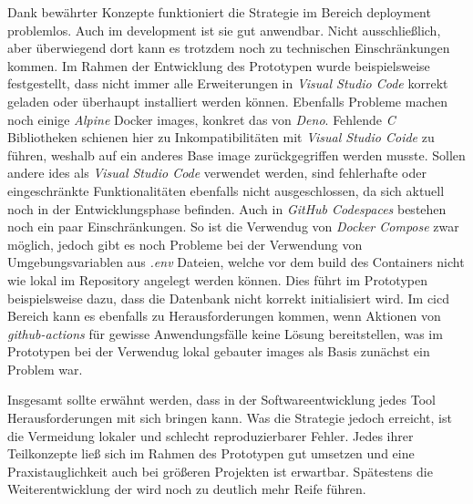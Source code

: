Dank bewährter Konzepte funktioniert die Strategie im Bereich \Gls{deployment} problemlos. Auch im \Gls{development} ist sie gut anwendbar. Nicht ausschließlich, aber überwiegend dort kann es trotzdem noch zu technischen Einschränkungen kommen. Im Rahmen der Entwicklung des Prototypen wurde beispielsweise festgestellt, dass nicht immer alle Erweiterungen in \textit{Visual Studio Code} korrekt geladen oder überhaupt installiert werden können. Ebenfalls Probleme machen noch einige \textit{Alpine} Docker \Glspl{image}, konkret das von \textit{Deno}. Fehlende \textit{C} Bibliotheken schienen hier zu Inkompatibilitäten mit \textit{Visual Studio Coide} zu führen, weshalb auf ein anderes Base \Gls{image} zurückgegriffen werden musste. Sollen andere \Glspl{ide} als \textit{Visual Studio Code} verwendet werden, sind fehlerhafte oder eingeschränkte Funktionalitäten ebenfalls nicht ausgeschlossen, da sich  aktuell noch in der Entwicklungsphase befinden. Auch in \textit{GitHub Codespaces} bestehen noch ein paar Einschränkungen. So ist die Verwendug von \textit{Docker Compose} zwar möglich, jedoch gibt es noch Probleme bei der Verwendung von Umgebungsvariablen aus \textit{.env} Dateien, welche vor dem \Gls{build} des Containers nicht wie lokal im Repository angelegt werden können. Dies führt im Prototypen beispielsweise dazu, dass die Datenbank nicht korrekt initialisiert wird. Im \Gls{cicd} Bereich kann es ebenfalls zu Herausforderungen kommen, wenn Aktionen von \textit{\Gls{github-actions}} für gewisse Anwendungsfälle keine Lösung bereitstellen, was im Prototypen bei der Verwendug lokal gebauter \Glspl{image} als Basis zunächst ein Problem war.

Insgesamt sollte erwähnt werden, dass in der Softwareentwicklung jedes Tool Herausforderungen mit sich bringen kann. Was die  Strategie jedoch erreicht, ist die Vermeidung lokaler und schlecht reproduzierbarer Fehler. Jedes ihrer Teilkonzepte ließ sich im Rahmen des Prototypen gut umsetzen und eine Praxistauglichkeit auch bei größeren Projekten ist erwartbar. Spätestens die Weiterentwicklung der  wird noch zu deutlich mehr Reife führen.
